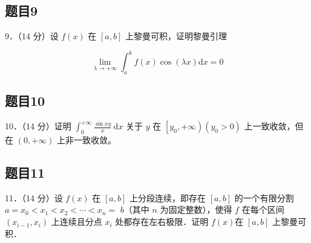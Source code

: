 \documentclass{article}
\begin{document}
\subsection{题目9}
9．（14 分）设 \(f(x)\) 在 \([a, b]\) 上黎曼可积，证明黎曼引理

\[
\lim _{\lambda \rightarrow+\infty} \int_{a}^{b} f(x) \cos (\lambda x) \mathrm{d} x=0
\]

\subsection{题目10}
10．（14 分）证明 \(\int_{0}^{+\infty} \frac{\sin x y}{x} \mathrm{~d} x\) 关于 \(y\) 在 \(\left[y_{0},+\infty\right)\left(y_{0}>0\right)\) 上一致收敛，但在 \((0,+\infty)\) 上非一致收敛。

\subsection{题目11}
11．（14 分）设 \(f(x)\) 在 \([a, b]\) 上分段连续，即存在 \([a, b]\) 的一个有限分割 \(a=x_{0}<x_{1}<x_{2}<\cdots<x_{n}=\) \(b\)（其中 \(n\) 为固定整数），使得 \(f\) 在每个区间 \(\left(x_{i-1}, x_{i}\right)\) 上连续且分点 \(x_{i}\) 处都存在左右极限．证明 \(f(x)\)在 \([a, b]\) 上黎曼可积．
\end{document}
